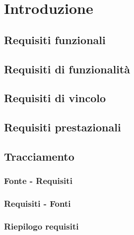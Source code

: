 \section{Introduzione}
\subsection{Requisiti funzionali}
\subsection{Requisiti di funzionalità}
\subsection{Requisiti di vincolo}
\subsection{Requisiti prestazionali}
\subsection{Tracciamento}
\subsubsection{Fonte - Requisiti}
\subsubsection{Requisiti - Fonti}
\subsubsection{Riepilogo requisiti}